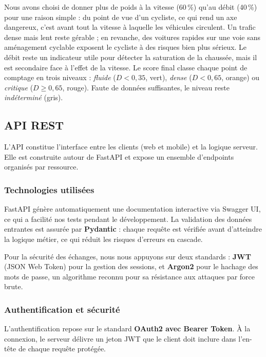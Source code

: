 Nous avons choisi de donner plus de poids à la vitesse (60\,\%) qu'au débit (40\,\%) pour une raison simple : du point de vue d'un cycliste, ce qui rend un axe dangereux, c'est avant tout la vitesse à laquelle les véhicules circulent. Un trafic dense mais lent reste gérable ; en revanche, des voitures rapides sur une voie sans aménagement cyclable exposent le cycliste à des risques bien plus sérieux. Le débit reste un indicateur utile pour détecter la saturation de la chaussée, mais il est secondaire face à l'effet de la vitesse. Le score final classe chaque point de comptage en trois niveaux : \textit{fluide} ($D < 0{,}35$, vert), \textit{dense} ($D < 0{,}65$, orange) ou \textit{critique} ($D \geq 0{,}65$, rouge). Faute de données suffisantes, le niveau reste \textit{indéterminé} (gris).

\subsection{API REST}

L'API constitue l'interface entre les clients (web et mobile) et la logique serveur. Elle est construite autour de FastAPI et expose un ensemble d'endpoints organisés par ressource.

\subsubsection{Technologies utilisées}

FastAPI génère automatiquement une documentation interactive via Swagger UI, ce qui a facilité nos tests pendant le développement. La validation des données entrantes est assurée par \textbf{Pydantic} : chaque requête est vérifiée avant d'atteindre la logique métier, ce qui réduit les risques d'erreurs en cascade.

Pour la sécurité des échanges, nous nous appuyons sur deux standards : \textbf{JWT} (JSON Web Token) pour la gestion des sessions, et \textbf{Argon2} pour le hachage des mots de passe, un algorithme reconnu pour sa résistance aux attaques par force brute.

\subsubsection{Authentification et sécurité}

L'authentification repose sur le standard \textbf{OAuth2 avec Bearer Token}. À la connexion, le serveur délivre un jeton JWT que le client doit inclure dans l'en-tête de chaque requête protégée.

